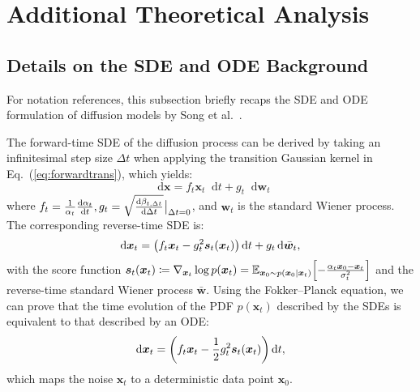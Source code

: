 \documentclass{article}
\def\vs{{\bm{s}}}
\def\vw{{\bm{w}}}
\def\vx{{\bm{x}}}
\newcommand{\E}{\mathbb{E}}
\theoremstyle{custom}
\theoremstyle{definition}
\theoremstyle{remark}
\let\originalleft\left
\let\originalright\right
\renewcommand{\left}{\mathopen{}\mathclose\bgroup\originalleft}
\renewcommand{\right}{\aftergroup\egroup\originalright}
\newcommand{\diff}{\mathop{}\!\mathrm{d}}
\begin{document}
\section{Additional Theoretical Analysis}

\subsection{Details on the SDE and ODE Background}
\label{sec:sdeode}

For notation references, this subsection briefly recaps the SDE and ODE formulation of diffusion models by Song et al.~. 

The forward-time SDE of the diffusion process can be derived by taking an infinitesimal step size $\Delta t$ when applying the transition Gaussian kernel in Eq.~(\ref{eq:forwardtrans}), which yields:
\begin{equation}
    \diff \vx = f_t \vx_t \diff t + g_t \diff \vw_t
\end{equation}
where $f_t = \frac{1}{\alpha_t} \frac{\diff \alpha_t}{\diff t}, g_t = \sqrt{\frac{\diff \beta_{t,\Delta t}}{\diff \Delta t}} \negmedspace \bigm|_{\Delta t = 0}$, and $\vw_t$ is the standard Wiener process. The corresponding reverse-time SDE is:
\begin{equation}
    \diff \vx_t = \left(f_t\vx_t - g^2_t \vs_t(\vx_t)  \right) \diff t + g_t \diff \bar{\vw}_t,
    \label{eq:reversesde}
\end{equation}
with the score function $\vs_t(\vx_t) \coloneq \nabla_{\vx_t}\log{p(\vx_t)} = \E_{\vx_0 \sim p(\vx_0|\vx_t)}\left[-\frac{\alpha_t \vx_0 - \vx_t}{\sigma_t^2}\right]$ and the reverse-time standard Wiener process $\bar{\vw}$. Using the Fokker--Planck equation, we can prove that the time evolution of the PDF $p(\vx_t)$ described by the SDEs is equivalent to that described by an ODE:
\begin{equation}
    \diff \vx_t = \left( f_t\vx_t - \frac{1}{2} g^2_t \vs_t(\vx_t) \right) \diff t,
\end{equation}
which maps the noise $\vx_t$ to a deterministic data point $\vx_0$.
\end{document}
